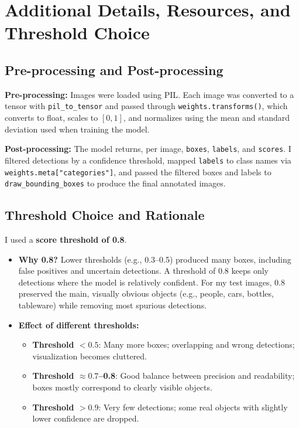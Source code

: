 \documentclass[11pt]{article}
\begin{document}
\section{Additional Details, Resources, and Threshold Choice}
\label{sec:details}

\subsection{Pre-processing and Post-processing}

\textbf{Pre-processing:} Images were loaded using PIL. Each image was converted to a tensor with \texttt{pil\_to\_tensor} and passed through \texttt{weights.transforms()}, which converts to float, scales to $[0,1]$, and normalizes using the mean and standard deviation used when training the model.

\textbf{Post-processing:} The model returns, per image, \texttt{boxes}, \texttt{labels}, and \texttt{scores}. I filtered detections by a confidence threshold, mapped \texttt{labels} to class names via \texttt{weights.meta[\texttt{"}categories\texttt{"}]}, and passed the filtered boxes and labels to \texttt{draw\_bounding\_boxes} to produce the final annotated images.

\subsection{Threshold Choice and Rationale}
\label{sec:threshold}

I used a \textbf{score threshold of 0.8}.

\begin{itemize}
  \item \textbf{Why 0.8?} Lower thresholds (e.g., 0.3--0.5) produced many boxes, including false positives and uncertain detections. A threshold of 0.8 keeps only detections where the model is relatively confident. For my test images, 0.8 preserved the main, visually obvious objects (e.g., people, cars, bottles, tableware) while removing most spurious detections.

  \item \textbf{Effect of different thresholds:}
  \begin{itemize}
    \item \textbf{Threshold $< 0.5$}: Many more boxes; overlapping and wrong detections; visualization becomes cluttered.
    \item \textbf{Threshold $\approx 0.7$--0.8}: Good balance between precision and readability; boxes mostly correspond to clearly visible objects.
    \item \textbf{Threshold $> 0.9$}: Very few detections; some real objects with slightly lower confidence are dropped.
  \end{itemize}
\end{itemize}
\end{document}
